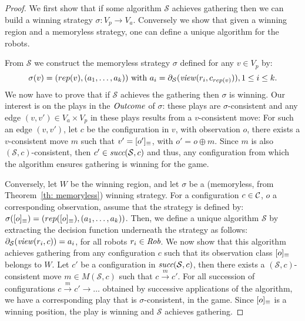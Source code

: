 \begin{proof}
We first show that if some algorithm $\mathcal{S}$ achieves gathering 
then we can build a winning strategy $\sigma: V_p\rightarrow V_a$. 
Conversely we show that given a winning region and a memoryless strategy, one can 
define a unique algorithm for the robots.

From $\mathcal{S}$ we construct the memoryless strategy $\sigma$ defined for any 
$v \in V_p$ by:  $$\sigma(v) = 
(rep(v), (a_1, \dots, a_k)) \textrm{ with } a_i=\partial_\mathcal{S}(\mathit{view}(r_i, c_{rep(v)})), 1\leq i \leq k.$$
We now have to prove that if $\mathcal{S}$ achieves the gathering then $\sigma$ is winning.
Our interest is on the plays in the $\mathit{Outcome}$ of $\sigma$:  these plays are $\sigma$-consistent
and any edge $(v, v') \in V_a \times V_p$ in these plays results from a $v$-consistent move: 
For such an edge $(v, v')$, let $c$ be the configuration in $v$, with observation $o$, there exists a $v$-consistent 
move $m$ such that $v'= [o']_{\equiv}$, with $o' = o \oplus m $. 
Since $m$ is also $(\mathcal{S}, c)$-consistent, then 
$c' \in \textit{succ}(\mathcal{S}, c)$ 
and thus, any configuration from which the algorithm ensures gathering is winning for the game.

Conversely, let $W$ be the winning region, and let $\sigma$ be a (memoryless, from 
Theorem~\ref{th: memoryless}) winning strategy. 
For a configuration $c \in \mathcal{C}$, $o$ a corresponding observation, 
assume that the strategy is defined by:   $\sigma([o]_{\equiv}) = 
(rep([o]_{\equiv}), (a_1, \dots, a_k))$.  Then, we define a unique algorithm $\mathcal{S}$ 
by extracting the decision function underneath the strategy as follows:   
$\partial_\mathcal{S}(\mathit{view}(r_i, c))= a_i$, for all robots $r_i \in \textit{Rob}$. 
We now show that this algorithm achieves gathering from any configuration $c$ such that its 
observation class $[o]_{\equiv}$ belongs to  $W$.
Let $c'$ be a configuration in $\textit{succ}(\mathcal{S}, c)$, then there exists a 
$(\mathcal{S}, c)$-consistent move $m \in M(\mathcal{S}, c)$ such that $c\xrightarrow{m} c' $. 
 For all succession of configurations 
$c\xrightarrow{m} c'\xrightarrow{} \dots$ obtained by successive applications of the algorithm, 
we have a corresponding play %
that is $\sigma$-consistent, in the game. 
Since $[o]_{\equiv}$ is a winning position, the play is winning and $\mathcal{S}$
achieves gathering. 
\end{proof}


